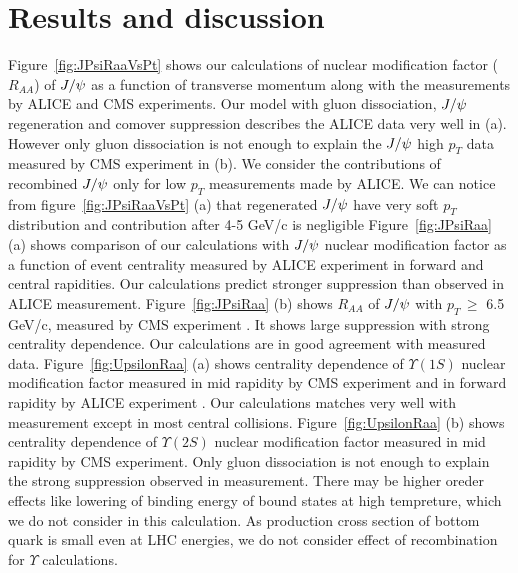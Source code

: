 \documentclass[aps,prc,preprint,superscriptaddress,showpacs,showkeys]{revtex4-1}
\begin{document}
\section{Results and discussion}
  Figure~\ref{fig:JPsiRaaVsPt} shows our calculations of 
nuclear modification factor ($R_{AA}$) of $J/\psi$ as a function of transverse momentum 
along with the measurements by  ALICE \cite{Abelev:2013ila} and CMS \cite{Mironov:2013jaa} experiments.
 Our model with gluon dissociation, $J/\psi$ regeneration and comover suppression describes the 
ALICE data very well in (a). However only gluon dissociation is not enough to explain the $J/\psi$ 
high $p_{T}$ data measured by CMS experiment in (b). 
  We consider the contributions of recombined $J/\psi$ only for low $p_{T}$ 
measurements made by ALICE. We can notice from figure~\ref{fig:JPsiRaaVsPt} (a) 
that regenerated $J/\psi$ have very soft $p_{T}$ distribution and
contribution after 4-5 GeV/c is negligible 
Figure~\ref{fig:JPsiRaa} (a) shows comparison of our calculations with $J/\psi$ 
nuclear modification factor as a function of event centrality measured by ALICE \cite{Abelev:2013ila}
experiment in forward and central rapidities. Our calculations predict
stronger suppression than observed in ALICE measurement.
Figure~\ref{fig:JPsiRaa} (b) shows $R_{AA}$ of $ J/\psi$ with $p_{T}\,\geq$ 6.5 GeV/c, measured 
by CMS experiment \cite{Mironov:2013jaa}. It shows large suppression with strong centrality dependence. Our
calculations are in good agreement with measured data.   
Figure~\ref{fig:UpsilonRaa} (a) shows centrality dependence of $\Upsilon(1S)$ nuclear modification factor
measured in mid rapidity by CMS experiment\cite{Chatrchyan:2012lxa} and in forward rapidity by ALICE experiment 
\cite{Abelev:2014nua}. Our calculations matches very well with measurement except in most central collisions.
Figure~\ref{fig:UpsilonRaa} (b) shows centrality dependence of $\Upsilon(2S)$ nuclear modification factor
measured in mid rapidity by CMS experiment. Only gluon dissociation is not enough to explain the strong 
suppression observed in measurement. There may be higher oreder effects like lowering of binding energy 
of bound states at high tempreture, which we do not consider in this calculation. As production cross section of 
bottom quark is small even at LHC energies, we do not consider effect of recombination for $\Upsilon$ calculations.
\end{document}
